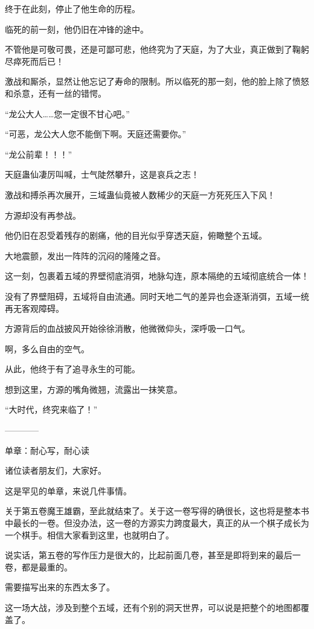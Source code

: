 \begin{this_body}
终于在此刻，停止了他生命的历程。

临死的前一刻，他仍旧在冲锋的途中。

不管他是可敬可畏，还是可鄙可悲，他终究为了天庭，为了大业，真正做到了鞠躬尽瘁死而后已！

激战和厮杀，显然让他忘记了寿命的限制。所以临死的那一刻，他的脸上除了愤怒和杀意，还有一丝的错愕。

“龙公大人……您一定很不甘心吧。”

“可恶，龙公大人您不能倒下啊。天庭还需要你。”

“龙公前辈！！！”

天庭蛊仙凄厉叫喊，士气陡然攀升，这是哀兵之志！

激战和搏杀再次展开，三域蛊仙竟被人数稀少的天庭一方死死压入下风！

方源却没有再参战。

他仍旧在忍受着残存的剧痛，他的目光似乎穿透天庭，俯瞰整个五域。

大地震颤，发出一阵阵的沉闷的隆隆之音。

这一刻，包裹着五域的界壁彻底消弭，地脉勾连，原本隔绝的五域彻底统合一体！

没有了界壁阻碍，五域将自由流通。同时天地二气的差异也会逐渐消弭，五域一统再无客观障碍。

方源背后的血战披风开始徐徐消散，他微微仰头，深呼吸一口气。

啊，多么自由的空气。

从此，他终于有了追寻永生的可能。

想到这里，方源的嘴角微翘，流露出一抹笑意。

“大时代，终究来临了！”

------------

单章：耐心写，耐心读

诸位读者朋友们，大家好。

这是罕见的单章，来说几件事情。

关于第五卷魔王雄霸，至此就结束了。关于这一卷写得的确很长，这也将是整本书中最长的一卷。但没办法，这一卷的方源实力跨度最大，真正的从一个棋子成长为一个棋手。相信大家看到这里，也就明白了。

说实话，第五卷的写作压力是很大的，比起前面几卷，甚至是即将到来的最后一卷，都是最重的。

需要描写出来的东西太多了。

这一场大战，涉及到整个五域，还有个别的洞天世界，可以说是把整个的地图都覆盖了。


\end{this_body}
